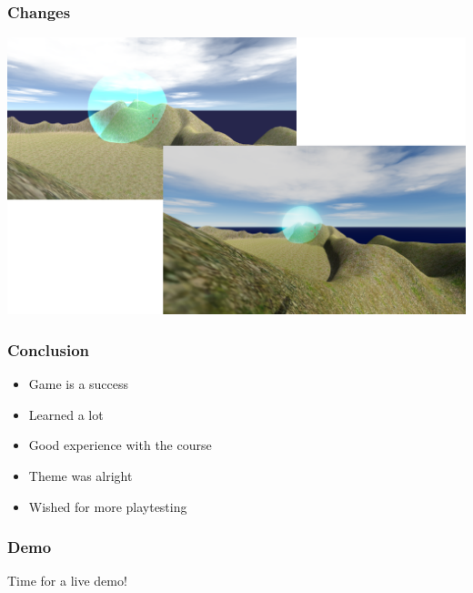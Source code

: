 \documentclass[xcolor=dvipsnames]{beamer}
\begin{document}
	\begin{frame}
		\frametitle{Changes}
		\hspace*{-0.4cm}
		\includegraphics[scale=0.34]{images/final/effectsCombined}
	\end{frame}
	
	\begin{frame}
		\frametitle{Conclusion}
		\begin{itemize}
			\setlength\itemsep{1em}
			\item Game is a success
			\item Learned a lot
			\item Good experience with the course
			\item Theme was alright
			\item Wished for more playtesting
		\end{itemize}
	\end{frame}
	
	\begin{frame}
		\frametitle{Demo}
		\centering
		\Huge
		Time for a live demo!
	\end{frame}
	
\end{document}
